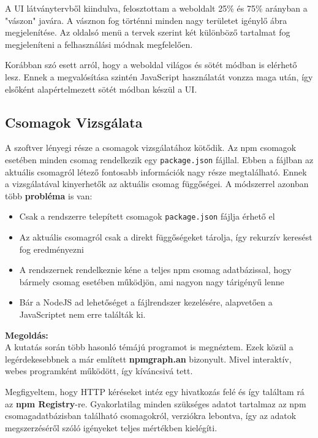 A UI látványtervből kiindulva, felosztottam a weboldalt 25\% és 75\% arányban a "vászon" javára. A vásznon fog történni minden nagy területet igénylő ábra megjelenítése. Az oldalsó menü a tervek szerint két különböző tartalmat fog megjeleníteni a felhasználási módnak megfelelően.

Korábban szó esett arról, hogy a weboldal világos és sötét módban is elérhető lesz. Ennek a megvalósítása szintén JavaScript használatát vonzza maga után, így elsőként alapértelmezett sötét módban készül a UI.

\subsection{Csomagok Vizsgálata}

A szoftver lényegi része a csomagok vizsgálatához kötődik. Az npm csomagok esetében minden csomag rendelkezik egy \texttt{package.json} fájllal. Ebben a fájlban az aktuális csomagról létező fontosabb információk nagy része megtalálható. Ennek a vizsgálatával kinyerhetők az aktuális csomag függőségei. A módszerrel azonban több \textbf{probléma} is van:

\begin{itemize}
	\item Csak a rendszerre telepített csomagok \texttt{package.json} fájlja érhető el
	\item Az aktuális csomagról csak a direkt függőségeket tárolja, így rekurzív keresést fog eredményezni
	\item A rendszernek rendelkeznie kéne a teljes npm csomag adatbázissal, hogy bármely csomag esetében működjön, ami nagyon nagy tárigényű lenne
	\item Bár a NodeJS ad lehetőséget a fájlrendszer kezelésére, alapvetően a JavaScriptet nem erre találták ki.
\end{itemize} 

\noindent \textbf{Megoldás:}\\

A kutatás során több hasonló témájú programot is megnéztem. Ezek közül a legérdekesebbnek a már említett \textbf{npmgraph.an} bizonyult. Mivel interaktív, webes programként működött, így kíváncsivá tett. 

Megfigyeltem, hogy HTTP kéréseket intéz egy hivatkozás felé és így találtam rá az \textbf{npm Registry}-re. Gyakorlatilag minden szükséges adatot tartalmaz az npm csomagadatbázisban található csomagokról, verziókra lebontva, így az adatok megszerzéséről szóló igényeket teljes mértékben kielégíti.

